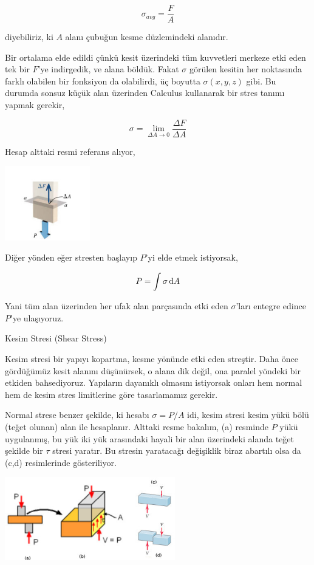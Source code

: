\documentclass[12pt,fleqn]{article}\usepackage{../../common}
\begin{document}
$$
\sigma_{avg} = \frac{F}{A}
$$

diyebiliriz, ki $A$ alanı çubuğun kesme düzlemindeki alanıdır.

Bir ortalama elde edildi çünkü kesit üzerindeki tüm kuvvetleri merkeze etki eden
tek bir $F$'ye indirgedik, ve alana böldük. Fakat $\sigma$ görülen kesitin her
noktasında farklı olabilen bir fonksiyon da olabilirdi, üç boyutta
$\sigma(x,y,z)$ gibi. Bu durumda sonsuz küçük alan üzerinden Calculus kullanarak
bir stres tanımı yapmak gerekir,

$$
\sigma = \lim_{\Delta A \to 0} \frac{\Delta F}{\Delta A}
$$

Hesap alttaki resmi referans alıyor,

\includegraphics[width=10em]{phy_020_strs_01_02.jpg}

Diğer yönden eğer stresten başlayıp $P$'yi elde etmek istiyorsak,

$$
P = \int \sigma \,\mathrm{d} A
$$

Yani tüm alan üzerinden her ufak alan parçasında etki eden $\sigma$'ları
entegre edince $P$'ye ulaşıyoruz.

Kesim Stresi (Shear Stress)

Kesim stresi bir yapıyı kopartma, kesme yönünde etki eden streştir. Daha
önce gördüğümüz kesit alanını düşünürsek, o alana dik değil, ona paralel
yöndeki bir etkiden bahsediyoruz. Yapıların dayanıklı olmasını istiyorsak
onları hem normal hem de kesim stres limitlerine göre tasarlamamız gerekir.

Normal strese benzer şekilde, ki hesabı $\sigma = P/A$ idi, kesim stresi kesim
yükü bölü (teğet olunan) alan ile hesaplanır. Alttaki resme bakalım, (a)
resminde $P$ yükü uygulanmış, bu yük iki yük arasındaki hayali bir alan
üzerindeki alanda teğet şekilde bir $\tau$ stresi yaratır. Bu stresin yaratacağı
değişiklik biraz abartılı olsa da (c,d) resimlerinde gösteriliyor.

\includegraphics[width=20em]{phy_020_strs_01_03.jpg}
\end{document}
